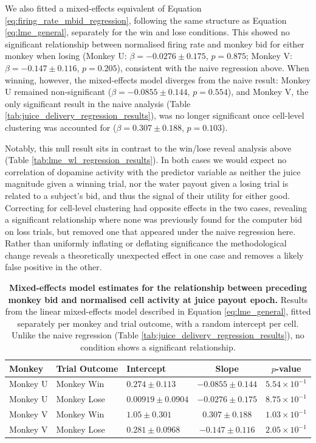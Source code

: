 We also fitted a mixed-effects equivalent of Equation \ref{eq:firing_rate_mbid_regression}, following the same structure as Equation \ref{eq:lme_general}, separately for the win and lose conditions. This showed no significant relationship between normalised firing rate and monkey bid for either monkey when losing (Monkey U: $\beta = -0.0276 \pm 0.175$, $p = 0.875$; Monkey V: $\beta = -0.147 \pm 0.116$, $p = 0.205$), consistent with the naive regression above. When winning, however, the mixed-effects model diverges from the naive result: Monkey U remained non-significant ($\beta = -0.0855 \pm 0.144$, $p = 0.554$), and Monkey V, the only significant result in the naive analysis (Table \ref{tab:juice_delivery_regression_results}), was no longer significant once cell-level clustering was accounted for ($\beta = 0.307 \pm 0.188$, $p = 0.103$).

Notably, this null result sits in contrast to the win/lose reveal analysis above (Table \ref{tab:lme_wl_regression_results}). In both cases we would expect no correlation of dopamine activity with the predictor variable as neither the juice magnitude given a winning trial, nor the water payout given a losing trial is related to a subject's bid, and thus the signal of their utility for either good. Correcting for cell-level clustering had opposite effects in the two cases, revealing a significant relationship where none was previously found for the computer bid on loss trials, but removed one that appeared under the naive regression here. Rather than uniformly inflating or deflating significance the methodological change reveals a theoretically unexpected effect in one case and removes a likely false positive in the other.

\begin{table}[htbp]
\centering
\begin{tabular}{lllcc}
\hline
\textbf{Monkey} & \textbf{Trial Outcome} & \textbf{Intercept} & \textbf{Slope} & $p$\textbf{-value} \\
\hline
Monkey U & Monkey Win & $0.274 \pm 0.113$ & $-0.0855 \pm 0.144$ & $5.54 \times 10^{-1}$ \\
Monkey U & Monkey Lose & $0.00919 \pm 0.0904$ & $-0.0276 \pm 0.175$ & $8.75 \times 10^{-1}$ \\
\hline
Monkey V & Monkey Win & $1.05 \pm 0.301$ & $0.307 \pm 0.188$ & $1.03 \times 10^{-1}$ \\
Monkey V & Monkey Lose & $0.281 \pm 0.0968$ & $-0.147 \pm 0.116$ & $2.05 \times 10^{-1}$ \\
\hline
\end{tabular}
\caption[Mixed-effects model estimates for the relationship between preceding monkey bid and normalised cell activity at juice payout epoch.]{\textbf{Mixed-effects model estimates for the relationship between preceding monkey bid and normalised cell activity at juice payout epoch.} Results from the linear mixed-effects model described in Equation \ref{eq:lme_general}, fitted separately per monkey and trial outcome, with a random intercept per cell. Unlike the naive regression (Table \ref{tab:juice_delivery_regression_results}), no condition shows a significant relationship.}
\label{tab:lme_juice_delivery_regression_results}
\end{table}

